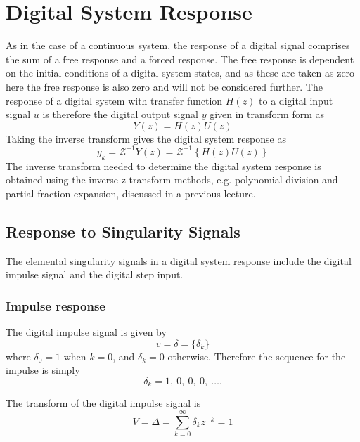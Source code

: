
\section*{Digital System Response}

As in the case of a continuous system, the response of a digital
signal comprises the sum of a free response and a forced response.
The free response is dependent on the initial conditions of a
digital system states, and as these are taken as zero here the
free response is also zero and will not be considered further. The
response of a digital system with transfer function $H(z)$ to a
digital input signal $u$ is therefore the digital output signal
$y$ given in transform form as
\begin{equation}\label{eq:l10e1}
  Y(z) =H(z) U(z)
\end{equation}
Taking the inverse transform gives the digital system response as
\begin{equation}\label{eq:l10e2}
  y_k = \mathcal{Z}^{-1}Y(z) = \mathcal{Z}^{-1} \left\{H(z)
  U(z)\right\}
\end{equation}
The inverse transform needed to determine the digital system
response is obtained using the inverse z transform methods, e.g.
polynomial division and partial fraction expansion, discussed in a
previous lecture.

\subsection*{Response to Singularity Signals}

The elemental singularity signals in a digital system response
include the digital impulse signal and the digital step input.

\subsubsection*{Impulse response}
The digital impulse signal is given by
\begin{equation}\label{eq:l10e3}
  v = \delta = \{\delta_k\}
\end{equation}
where $\delta_0 = 1$ when $k = 0$, and $\delta_k = 0$ otherwise.
Therefore the sequence for the impulse is simply
\[\delta_k = 1,\ 0,\ 0,\ 0,\ \ldots.\]

The transform of the digital impulse signal is
\begin{equation}\label{eq:l10e4}
  V = \Delta = \sum_{k=0}^{\infty}\delta_k z^{-k} = 1
\end{equation}

